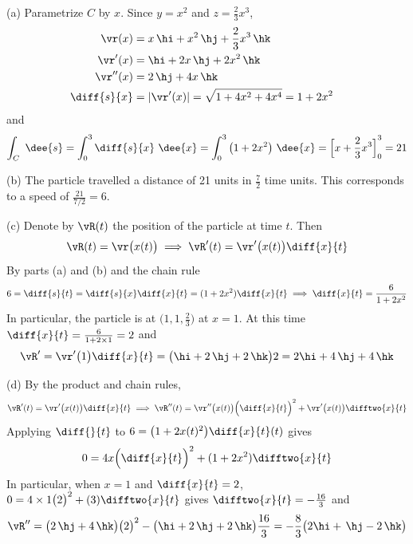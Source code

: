 \begin{solution}
(a) Parametrize $C$ by $x$. Since $y=x^2$ and $z=\frac{2}{3}x^3$,
\begin{align*}
\vr(x)&=x\,\hi+x^2\,\hj+\frac{2}{3}x^3\,\hk\cr
\vr'(x)&=\hi+2x\,\hj+2x^2\,\hk\cr
\vr''(x)&=2\,\hj+4x\,\hk\cr
\diff{s}{x}
&=|\vr'(x)|
=\sqrt{1+4x^2+4x^4}=1+2x^2\cr
\end{align*}
and
$$
\int_C \ \dee{s}
=\int_0^3 \diff{s}{x}\ \dee{x}
=\int_0^3 \big(1+2x^2\big)\ \dee{x}
={\Big[x+\frac{2}{3}x^3\Big]}_0^3
=21
$$

(b) The particle travelled a distance of 21 units in $\frac{7}{2}$
time units. This corresponds to a speed of $\frac{21}{7/2}=6$.

(c) Denote by $\vR(t)$ the position of the particle at time $t$.
Then
$$
\vR(t)=\vr\big(x(t)\big)\implies
\vR'(t)=\vr'\big(x(t)\big)\diff{x}{t}
$$
By parts (a) and (b) and the chain rule
$$
6=\diff{s}{t}=\diff{s}{x}\diff{x}{t}=(1+2x^2)\diff{x}{t}
\implies \diff{x}{t}=\frac{6}{1+2x^2}
$$
In particular, the particle is at $\big(1,1,\frac{2}{3}\big)$ at $x=1$.
At this time $\diff{x}{t}=\frac{6}{1+2\times 1}=2$ and
$$
\vR'=\vr'\big(1\big)\diff{x}{t}
=\big(\hi+2\,\hj+2\,\hk\big)2
=2\hi+4\,\hj+4\,\hk
$$

(d) By the product and chain rules,
$$
\vR'(t)=\vr'\big(x(t)\big)\diff{x}{t}\implies
\vR''(t)=\vr''\big(x(t)\big){\Big(\diff{x}{t}\Big)}^2
+\vr'\big(x(t)\big)\difftwo{x}{t}
$$
Applying $\diff{\hfill}{t}$ to $6=\big(1+2x(t)^2\big)\diff{x}{t}(t)$ gives
$$
0=4x{\Big(\diff{x}{t}\Big)}^2+(1+2x^2)\difftwo{x}{t}
$$
In particular, when $x=1$ and $\diff{x}{t}=2$,
 $0=4\times 1\big(2\big)^2+(3)\difftwo{x}{t}$ gives
$\difftwo{x}{t}=-\frac{16}{3}$ and
$$
\vR''=\big(2\,\hj+4\,\hk\big)\big(2\big)^2
-\big(\hi+2\,\hj+2\,\hk\big)\frac{16}{3}
= -\frac{8}{3}\big(2\hi+\,\hj-2\,\hk\big)
$$

\end{solution}







